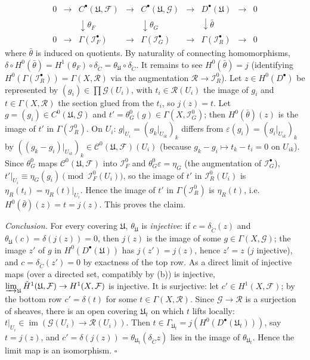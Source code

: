 \documentclass[11pt]{article}
\begin{document}
\[
\begin{array}{ccccccccc}
0&\to&C^\bullet(\mathfrak U,\mathcal F)&\to&C^\bullet(\mathfrak U,\mathcal G)&\to&D^\bullet(\mathfrak U)&\to&0\\
&&\downarrow\theta_F&&\downarrow\theta_G&&\downarrow\bar\theta&&\\
0&\to&\Gamma(\mathcal I_F^\bullet)&\to&\Gamma(\mathcal I_G^\bullet)&\to&\Gamma(\mathcal I_R^\bullet)&\to&0
\end{array}
\]
where $\bar\theta$ is induced on quotients. By naturality of connecting homomorphisms, $\delta\circ H^0(\bar\theta)=H^1(\theta_F)\circ\delta_{\check C}=\theta_{\mathfrak U}\circ\delta_{\check C}$. It remains to see $H^0(\bar\theta)=j$ (identifying $H^0(\Gamma(\mathcal I_R^\bullet))=\Gamma(X,\mathcal R)$ via the augmentation $\mathcal R\to\mathcal I_R^0$). Let $z\in H^0(D^\bullet)$ be represented by $(g_i)\in\prod\mathcal G(U_i)$, with $t_i\in\mathcal R(U_i)$ the image of $g_i$ and $t\in\Gamma(X,\mathcal R)$ the section glued from the $t_i$, so $j(z)=t$. Let $g=(g_i)\in C^0(\mathfrak U,\mathcal G)$ and $t'=\theta_G^0(g)\in\Gamma(X,\mathcal I_G^0)$; then $H^0(\bar\theta)(z)$ is the image of $t'$ in $\Gamma(\mathcal I_R^0)$. On $U_i$: $g|_{U_i}=(g_k|_{U_{ik}})_k$ differs from $\varepsilon(g_i)=(g_i|_{U_{ik}})_k$ by $((g_k-g_i)|_{U_{ik}})_k\in\mathcal C^0(\mathfrak U,\mathcal F)(U_i)$ (because $g_k-g_i\mapsto t_k-t_i=0$ on $U_{ik}$). Since $\theta_G^0$ maps $\mathcal C^0(\mathfrak U,\mathcal F)$ into $\mathcal I_F^0$ and $\theta_G^0\varepsilon=\eta_G$ (the augmentation of $\mathcal I_G^\bullet$), $t'|_{U_i}\equiv\eta_G(g_i)\pmod{\mathcal I_F^0(U_i)}$, so the image of $t'$ in $\mathcal I_R^0(U_i)$ is $\eta_R(t_i)=\eta_R(t)|_{U_i}$. Hence the image of $t'$ in $\Gamma(\mathcal I_R^0)$ is $\eta_R(t)$, i.e.\ $H^0(\bar\theta)(z)=t=j(z)$. This proves the claim.

\emph{Conclusion.} For every covering $\mathfrak U$, $\theta_{\mathfrak U}$ is \emph{injective}: if $c=\delta_{\check C}(z)$ and $\theta_{\mathfrak U}(c)=\delta(j(z))=0$, then $j(z)$ is the image of some $g\in\Gamma(X,\mathcal G)$; the image $z'$ of $g$ in $H^0(D^\bullet(\mathfrak U))$ has $j(z')=j(z)$, hence $z'=z$ ($j$ injective), and $c=\delta_{\check C}(z')=0$ by exactness of the top row. As a direct limit of injective maps (over a directed set, compatibly by (b)) is injective, $\varinjlim_{\mathfrak U}\check H^1(\mathfrak U,\mathcal F)\to H^1(X,\mathcal F)$ is injective. It is surjective: let $c'\in H^1(X,\mathcal F)$; by the bottom row $c'=\delta(t)$ for some $t\in\Gamma(X,\mathcal R)$. Since $\mathcal G\to\mathcal R$ is a surjection of sheaves, there is an open covering $\mathfrak U_t$ on which $t$ lifts locally: $t|_{U_i}\in\operatorname{im}(\mathcal G(U_i)\to\mathcal R(U_i))$. Then $t\in\Gamma_{\mathfrak U_t}=j(H^0(D^\bullet(\mathfrak U_t)))$, say $t=j(z)$, and $c'=\delta(j(z))=\theta_{\mathfrak U_t}(\delta_{\check C}z)$ lies in the image of $\theta_{\mathfrak U_t}$. Hence the limit map is an isomorphism. \hfill$\square$
\end{document}
